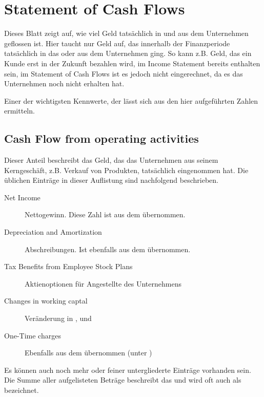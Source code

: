 %
\section{Statement of Cash Flows}
Dieses Blatt zeigt auf, wie viel Geld tatsächlich in und aus dem Unternehmen geflossen ist.
Hier taucht nur Geld auf, das innerhalb der Finanzperiode tatsächlich in das oder aus dem Unternehmen ging.
So kann z.B. Geld, das ein Kunde erst in der Zukunft bezahlen wird, im Income Statement bereits enthalten sein, im Statement of Cash Flows ist es jedoch nicht eingerechnet, da es das Unternehmen noch nicht erhalten hat.

Einer der wichtigsten Kennwerte, der \freeCashFlow lässt sich aus den hier aufgeführten Zahlen ermitteln.

%
\subsection{Cash Flow from operating activities}

Dieser Anteil beschreibt das Geld, das das Unternehmen aus seinem Kerngeschäft, z.B. Verkauf von Produkten, tatsächlich eingenommen hat.
Die üblichen Einträge in dieser Auflistung sind nachfolgend beschrieben.
\begin{description}
    \item[Net Income] Nettogewinn. Diese Zahl ist aus dem  übernommen.
    \item[Depreciation and Amortization] Abschreibungen. Ist ebenfalls aus dem  übernommen.
    \item[Tax Benefits from Employee Stock Plans] Aktienoptionen für Angestellte des Unternehmens
    \item[Changes in working captal] Veränderung in ,  und 
    \item[One-Time charges] Ebenfalls aus dem  übernommen (unter ) 
\end{description}

Es können auch noch mehr oder feiner untergliederte Einträge vorhanden sein.
Die Summe aller aufgelisteten Beträge beschreibt das \textbf{} und wird oft auch als  bezeichnet.

